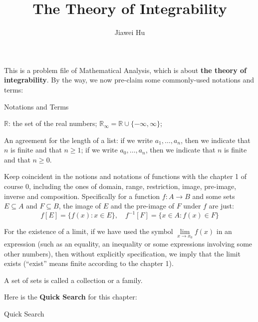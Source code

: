 \documentclass{article}
\title{\LARGE \textbf{The Theory of Integrability}}
\author{\large Jiawei Hu}
\begin{document}
\maketitle
\tableofcontents
\newpage

This is a problem file of Mathematical Analysis, which is about \textbf{the theory of integrability}. By the way, we now pre-claim some commonly-used notations and terms:
\begin{Df}{Notations and Terms}
    \begin{compactenum}
        \item $\mathbb{R}$: the set of the real numbers; $\mathbb{R}_\infty = \mathbb{R}\cup\{-\infty, \infty\}$;
        \item An agreement for the length of a list: if we write $a_1, \dots, a_n$, then we indicate that $n$ is finite and that $n\geq 1$; if we write $a_0, \dots, a_n$, then we indicate that $n$ is finite and that $n\geq 0$.
        \item Keep coincident in the notions and notations of functions with the chapter 1 of course 0, including the ones of domain, range, restriction, image, pre-image, inverse and composition. Specifically for a function $f: A\rightarrow B$ and some sets $E\subseteq A$ and $F\subseteq B$, the image of $E$ and the pre-image of $F$ under $f$ are just:
        $$f[E] = \{f(x): x\in E\},\quad f^{-1}[F] = \{x\in A: f(x)\in F\}$$
        \item For the existence of a limit, if we have used the symbol $\lim\limits_{x\to x_0} f(x)$ in an expression (such as an equality, an inequality or some expressions involving some other numbers), then without explicitly specification, we imply that the limit exists (``exist'' means finite according to the chapter 1).
        \item A set of sets is called a collection or a family.
    \end{compactenum}
\end{Df}

Here is the \textbf{Quick Search} for this chapter:
\begin{Th}{Quick Search}
\end{Th}
\end{document}
